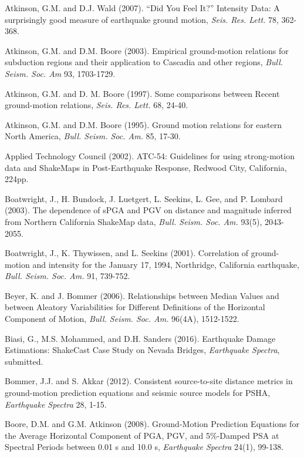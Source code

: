 \documentclass[letterpaper,10pt,english]{sphinxmanual}
\begin{document}
\label{references:atkinson-wald2007}
Atkinson, G.M. and D.J. Wald (2007). ``Did You Feel It?'' Intensity Data: A surprisingly good measure
of earthquake ground motion, \emph{Seis. Res. Lett.} 78, 362-368.

Atkinson, G.M. and D.M. Boore (2003). Empirical ground-motion relations for subduction regions and
their application to Cascadia and other regions, \emph{Bull. Seism. Soc. Am} 93, 1703-1729.

Atkinson, G.M. and D. M. Boore (1997). Some comparisons between Recent ground-motion relations,
\emph{Seis. Res. Lett.} 68, 24-40.

Atkinson, G.M. and D.M. Boore (1995). Ground motion relations for eastern North America, \emph{Bull. Seism. Soc. Am.} 85, 17-30.

\label{references:atc2002}
Applied Technology Council (2002). ATC-54: Guidelines for using strong-motion data and ShakeMaps in
Post-Earthquake Response, Redwood City, California, 224pp.

Boatwright, J., H. Bundock, J. Luetgert, L. Seekins, L. Gee, and P. Lombard (2003). The dependence of
sPGA and PGV on distance and magnitude inferred from Northern California ShakeMap data, \emph{Bull.
Seism. Soc. Am.} 93(5), 2043-2055.

Boatwright, J., K. Thywissen, and L. Seekins (2001). Correlation of ground-motion and intensity for the
January 17, 1994, Northridge, California earthquake, \emph{Bull. Seism. Soc. Am.} 91, 739-752.

\label{references:beyer2006}
Beyer, K. and J. Bommer (2006). Relationships between Median Values and between Aleatory
Variabilities for Different Definitions of the Horizontal Component of Motion, \emph{Bull. Seism. Soc. Am.} 96(4A), 1512-1522.

\label{references:biasi2016}
Biasi, G., M.S. Mohammed, and D.H. Sanders (2016). Earthquake Damage
Estimations: ShakeCast Case Study on Nevada Bridges, \emph{Earthquake
Spectra}, submitted.

\label{references:bommer2012}
Bommer, J.J. and S. Akkar (2012). Consistent source-to-site distance metrics in ground-motion prediction
equations and seismic source models for PSHA, \emph{Earthquake Spectra} 28, 1-15.

\label{references:ba2008}
Boore, D.M. and G.M. Atkinson (2008). Ground-Motion Prediction Equations for the Average
Horizontal Component of PGA, PGV, and 5\%-Damped PSA at Spectral Periods between 0.01 s and
10.0 s, \emph{Earthquake Spectra} 24(1), 99-138.
\end{document}
